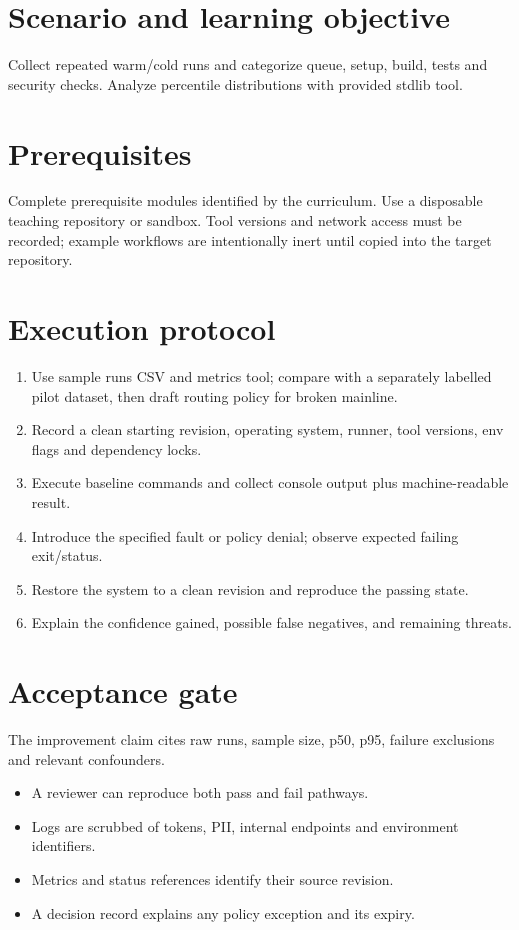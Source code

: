 \documentclass[11pt,letterpaper]{article}
\begin{document}
\makedoctitle
\makedocsummary
\tableofcontents
\clearpage
\section{Scenario and learning objective}
Collect repeated warm/cold runs and categorize queue, setup, build, tests and security checks. Analyze percentile distributions with provided stdlib tool.

\section{Prerequisites}
Complete prerequisite modules identified by the curriculum. Use a disposable teaching repository or sandbox. Tool versions and network access must be recorded; example workflows are intentionally inert until copied into the target repository.

\section{Execution protocol}
\begin{enumerate}
\item Use sample runs CSV and metrics tool; compare with a separately labelled pilot dataset, then draft routing policy for broken mainline.
\item Record a clean starting revision, operating system, runner, tool versions, env flags and dependency locks.
\item Execute baseline commands and collect console output plus machine-readable result.
\item Introduce the specified fault or policy denial; observe expected failing exit/status.
\item Restore the system to a clean revision and reproduce the passing state.
\item Explain the confidence gained, possible false negatives, and remaining threats.
\end{enumerate}
\section{Acceptance gate}
The improvement claim cites raw runs, sample size, p50, p95, failure exclusions and relevant confounders.

\begin{itemize}
\item A reviewer can reproduce both pass and fail pathways.
\item Logs are scrubbed of tokens, PII, internal endpoints and environment identifiers.
\item Metrics and status references identify their source revision.
\item A decision record explains any policy exception and its expiry.
\end{itemize}
\end{document}
